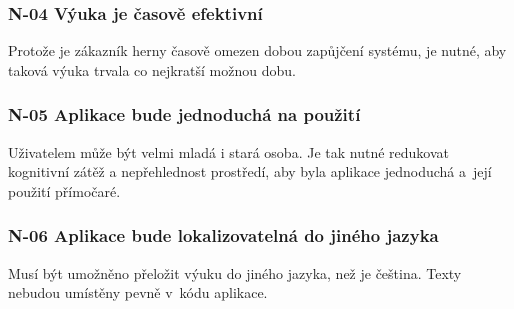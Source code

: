 \subsubsection*{N-04 Výuka je časově efektivní}
Protože je zákazník herny časově omezen dobou zapůjčení systému, je
nutné, aby taková výuka trvala co nejkratší možnou dobu.

\subsubsection*{N-05 Aplikace bude jednoduchá na použití}
Uživatelem může být
velmi mladá i stará osoba. Je tak nutné redukovat kognitivní zátěž a
nepřehlednost prostředí, aby byla aplikace jednoduchá a~její použití
přímočaré.

\subsubsection*{N-06 Aplikace bude lokalizovatelná do jiného jazyka}
Musí být
umožněno přeložit výuku do jiného jazyka, než je čeština. Texty nebudou
umístěny pevně v~kódu aplikace.
